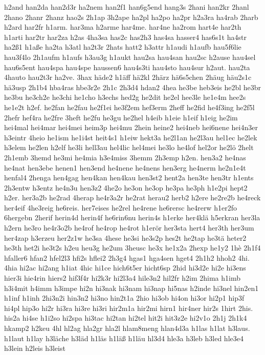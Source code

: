 {h2and
han2da
han2d3r
ha2nem
han2f1
han6g5end
hang3s
2hani
han2kr
2hanl
2hano
2hanr
2hanz
hao2s
2h1ap
3h2ape
ha2pl
ha2po
ha2pr
h2a3ra
ha4rab
2harb
h2ard
har2fr
h1arm.
har3ma
h2arme
har4me.
har4ne
ha2rom
hart4e
har2th
h1arti
har2tr
har2za
h2as
4ha3sa
has2c
has2h3
has4sa
hasser4
has6s1t
ha4str
ha2ß1
h1aße
ha2ta
h3atl
ha2t3r
2hats
hatt2
h3attr
h1audi
h1aufb
hau5f6lie
hau3f4lo
2h1aufm
h1aufs
h3au3g
h1aukt
hau2sa
hau4san
hau2sc
h2ause
hau4sel
hau6s5ent
hau4spa
hau4spe
haussen6
hau4s3ti
hau4sto
hau4sur
h2aut.
hau2ta
4hauto
hau2t3r
ha2ve.
3hax
häde2
h1äff
hä2kl
2härz
hä6s5chen
2häug
häu2s1c
hä3usp
2h1b4
hba4ras
hbe3r2e
2h1c
2h3d4
hdan2
4hea
he3be
heb3eis
he2bl
he3br
he3bu
he3ch2e
he3chi
he1cho
h3echs
hed2g
he2dit
he2el
hee3le
he1e4m
hee2s
he1e2t
h2ef.
he2fan
he2fau
he2f1ei
he3f2em
hef3erm
2heff
he2fid
he4f3ing
he2f5l
2hefr
hef4ra
he2fre
3heft
he2fu
he3gu
he2hel
h4eib
h1eie
h1eif
h1eig
he2im
hei4mal
hei4mar
hei4mei
heim3p
hei4mu
2hein
heine2
hei4neb
hei6nene
hei4n3er
h3eintr
4heio
he1ism
he1i4st
heit4s1
h1eiw
hekt3a
he2l1an
he2l3au
hel1ec
he2lek
h3elem
he2len
h2elf
he3li
hell3au
hel4lic
hel4mei
he3lo
he4lof
hel2or
he2lö
2helt
2h1emb
3hemd
he3mi
he4mia
h3e4miss
3hemm
2h3emp
h2en.
hen3a2
he4nas
he4nat
hen3ebe
henen1
hen3end
he4nene
he4nens
hen3erg
he4nerm
he2n1e4t
henfal4
2henga
hen4gag
hen4kan
hen4kau
hen3st2
hent2a
hen3te
hen3tr
h1ents
2h3entw
h3entz
he4n3u
hen3z2
4he2o
he3on
he3op
he3pa
he3ph
h1e2pi
hept2
h2er.
her3a2b
he2rad
4herap
he4r3a2r
he2rat
herau2
herb2
h2ere
he2re2b
he4reck
her4eif
4he3reig
he6reis.
her7eises
he2rel
he4rene
he6rersc
he4rerw
h1er2fo
6hergebn
2herif
herin4d
herin4f
he6rin6nu
herin4s
h1erke
her4klä
h5erkran
her3la
h2ern
he3ro
he4r3o2b
he4rof
he4rop
he4rot
h1erör
her3sta
hert4
her3th
her3um
her4zap
h3erzeu
her2z1w
he3sa
4hese
he3si
he3s2p
hes2t
he2tap
he3tä
heter2
he3th
het2i
he3t2s
h2eu
heu3g
he2um
3heusc
he3x
he1x2a
2hexp
he1y2
1hè
2h1f4
hfaller6
hfan2
hfel2l3
hfi2s
hflei2
2h3g4
hgas1
hga4sen
hget4
2h1h2
hhoh2
4hi.
4hia
hi2ac
hi2ang
h1iat
4hic
hi1ce
hich6t5er
hicht6sp
2hid
hi3d2e
hi2e
hi3ens
hier3i
hie4rin
hiers2
hif3f4r
hi2k3r
hi2l3a4
hile3n2
hil2fr
h2im
2hima
h1imb
h3i4mit
h4imm
h3impe
hi2n
hi3nak
hi3nam
hi3nap
hi5nas
h2inde
hi3nel
hin2en1
h1inf
h1inh
2hi3n2i
hin3n2
hi3no
hin2t1a
2hio
hi3ob
hi4on
hi3or
hi2p1
hip3f
hi4pl
hip3o
hi2r
hi3ra
hi3re
hi3ri
hir2m1a
hir2mi
hirn1
hir4ner
hir2s
1hirt
2his.
his2a
hi4se
h1i2so
hi2spa
hi3tac
hi2tan
hi2tel
hit2i
hit3z2e
hi2v1o
2h1j
2h1k4
hkamp2
h2keu
4hl
hl2ag
hla2gr
hla2l
hlam8meng
hlan4d3a
h1las
h1lat
h3laus.
h1laut
h1lay
h3läche
h3läd
h1läs
h1läß
h1läu
hl3d4
hle3a
h3leb
h3led
hle3e4
h3lein
h2leis
h3leist
}
